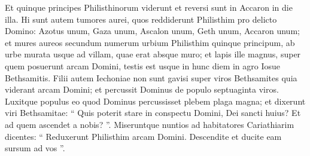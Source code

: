 \begin{biblechapter}
\begin{biblechapter}
\begin{biblechapter}
\begin{biblechapter}
\begin{biblechapter}
\begin{biblechapter}
\verse Et quinque principes Philisthinorum viderunt et reversi sunt in Accaron in die illa.
 \verse Hi sunt autem tumores aurei, quos reddiderunt Philisthim pro delicto Domino: Azotus unum, Gaza unum, Ascalon unum, Geth unum, Accaron unum; 
\verse et mures aureos secundum numerum urbium Philisthim quinque principum, ab urbe murata usque ad villam, quae erat absque muro; et lapis ille magnus, super quem posuerunt arcam Domini, testis est usque in hunc diem in agro Iosue Bethsamitis.
 \verse Filii autem Iechoniae non sunt gavisi super viros Bethsamites quia viderant arcam Domini; et percussit Dominus de populo septuaginta viros. Luxitque populus eo quod Dominus percussisset plebem plaga magna; 
\verse et dixerunt viri Bethsamitae: “ Quis poterit stare in conspectu Domini, Dei sancti huius? Et ad quem ascendet a nobis? ”. 
\verse Miseruntque nuntios ad habitatores Cariathiarim dicentes: “ Reduxerunt Philisthim arcam Domini. Descendite et ducite eam sursum ad vos ”.
 

\end{biblechapter}
\end{biblechapter}
\end{biblechapter}
\end{biblechapter}
\end{biblechapter}
\end{biblechapter}
